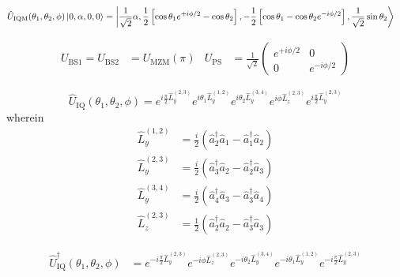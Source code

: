 \begin{equation}
	\begin{split}
		\hat{U}_\text{IQM}(\theta_1,\theta_2,\phi)
		\ket{0,\alpha,0,0}
		&=
		\ket{\frac{1}{\sqrt{2}}\alpha,\frac{1}{2}\left[\cos\theta_1e^{+i\phi/2}-\cos\theta_2\right],-\frac{1}{2}\left[\cos\theta_1-\cos\theta_2e^{-i\phi/2}\right],\frac{1}{\sqrt{2}}\sin\theta_2}
	\end{split}
\end{equation}

\begin{align}
	U_\text{BS1}
	=
	U_\text{BS2}
	&=
	U_\text{MZM}(\pi)
	&
	U_\text{PS}
	&=
	\frac{1}{\sqrt{2}}
	\begin{pmatrix}
		e^{+i\phi/2} & 0 \\
		0 & e^{-i\phi/2}
	\end{pmatrix}
\end{align}

\begin{equation}
	\hat{U}_\text{IQ}(\theta_1,\theta_2,\phi)
	=
	e^{i\frac{\pi}{2}\hat{L}_y^{(2,3)}}
	e^{i\theta_1\hat{L}_y^{(1,2)}}
	e^{i\theta_2\hat{L}_y^{(3,4)}}
	e^{i\phi\hat{L}_z^{(2,3)}}
	e^{i\frac{\pi}{2}\hat{L}_y^{(2,3)}}
\end{equation}
wherein~\cite{Leonhardt2010}
\begin{align}
	\hat{L}_y^{(1,2)}
	&=
	\frac{i}{2}
	\left(
		\hat{a}_2^\dagger
		\hat{a}_1
		-
		\hat{a}_1^\dagger
		\hat{a}_2
	\right)
	\\
	\hat{L}_y^{(2,3)}
	&=
	\frac{i}{2}
	\left(
		\hat{a}_3^\dagger
		\hat{a}_2
		-
		\hat{a}_2^\dagger
		\hat{a}_3
	\right)
	\\
	\hat{L}_y^{(3,4)}
	&=
	\frac{i}{2}
	\left(
		\hat{a}_4^\dagger
		\hat{a}_3
		-
		\hat{a}_3^\dagger
		\hat{a}_4
	\right)
	\\
	\hat{L}_z^{(2,3)}
	&=
	\frac{1}{2}
	\left(
		\hat{a}_2^\dagger
		\hat{a}_2
		-
		\hat{a}_3^\dagger
		\hat{a}_3
	\right)
\end{align}

\begin{equation}
	\begin{split}
		\hat{U}_\text{IQ}^\dagger(\theta_1,\theta_2,\phi)
		&=
		e^{-i\frac{\pi}{2}\hat{L}_y^{(2,3)}}
		e^{-i\phi\hat{L}_z^{(2,3)}}
		e^{-i\theta_2\hat{L}_y^{(3,4)}}
		e^{-i\theta_1\hat{L}_y^{(1,2)}}
		e^{-i\frac{\pi}{2}\hat{L}_y^{(2,3)}}
	\end{split}
\end{equation}

